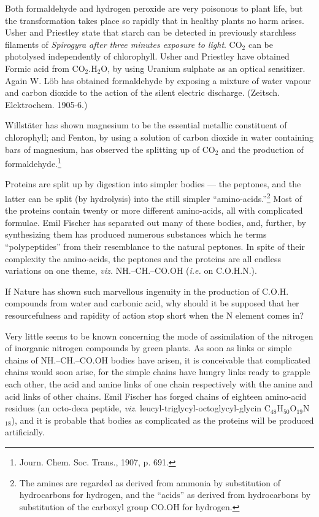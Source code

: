 \documentclass[a4paper, 12pt, oneside, landscape]{article}
\begin{document}
Both formaldehyde and hydrogen peroxide are very poisonous to plant life, but the transformation takes place so rapidly that in healthy plants no harm arises. Usher and Priestley state that starch can be detected in previously starchless filaments of \emph{Spirogyra after three minutes exposure to light}. CO$_{2}$ can be photolysed independently of chlorophyll. Usher and Priestley have obtained Formic acid from CO$_{2}$.H$_{2}$O, by using Uranium sulphate as an optical sensitizer. Again W. Löb has obtained formaldehyde by exposing a mixture of water vapour and carbon dioxide to the action of the silent electric discharge. (Zeitsch. Elektrochem. 1905-6.)

Willstäter has shown magnesium to be the essential metallic constituent of chlorophyll; and Fenton, by using a solution of carbon dioxide in water containing bars of magnesium, has observed the splitting up of CO$_{2}$ and the production of formaldehyde.\footnote{Journ. Chem. Soc. Trans., 1907, p. 691.}

Proteins are split up by digestion into simpler bodies --- the peptones, and the latter can be split (by hydrolysis) into the still simpler ``amino-acids.''\footnote{The amines are regarded as derived from ammonia by substitution of hydrocarbons for hydrogen, and the ``acids'' as derived from hydrocarbons by substitution of the carboxyl group CO.OH for hydrogen.} Most of the proteins contain twenty or more different amino-acids, all with complicated formulae. Emil Fischer has separated out many of these bodies, and, further, by synthesizing them has produced numerous substances which he terms ``polypeptides'' from their resemblance to the natural peptones. In spite of their complexity the amino-acids, the peptones and the proteins are all endless variations on one theme, \emph{viz.} NH.--CH.--CO.OH (\emph{i.e.} on C.O.H.N.).

If Nature has shown such marvellous ingenuity in the production of C.O.H. compounds from water and carbonic acid, why should it be supposed that her resourcefulness and rapidity of action stop short when the N element comes in?

Very little seems to be known concerning the mode of assimilation of the nitrogen of inorganic nitrogen compounds by green plants. As soon as links or simple chains of NH.--CH.--CO.OH bodies have arisen, it is conceivable that complicated chains would soon arise, for the simple chains have hungry links ready to grapple each other, the acid and amine links of one chain respectively with the amine and acid links of other chains. Emil Fischer has forged chains of eighteen amino-acid residues (an octo-deca peptide, \emph{viz.} leucyl-triglycyl-octoglycyl-glycin C$_{48}$H$_{50}$O$_{19}$N$_{18}$), and it is probable that bodies as complicated as the proteins will be produced artificially.
\end{document}
